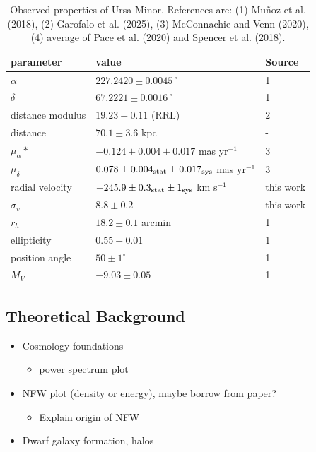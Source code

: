 \begin{table}[t]
\centering
\caption{Observed properties of Ursa Minor. References are: (1) Muñoz et al. (2018), (2) Garofalo et al. (2025), (3) McConnachie and Venn (2020), (4) average of Pace et al. (2020) and Spencer et al. (2018).}
\label{tbl:Observed-properties-of-Ursa-Minor-References-are:-1-Muñoz-et-al-2018-2-Garofalo-et-al-2025-3-McConnachie-and-Venn-2020-4-average-of-Pace-et-al-2020-and-Spencer-et-al-2018}
\begin{tabular}{lll}
\toprule
parameter & value & Source\\
\midrule
$\alpha$ & $ 227.2420 \pm 0.0045$˚ & 1\\
$\delta$ & $67.2221 \pm 0.0016$˚ & 1\\
distance modulus & $19.23 \pm 0.11$ (RRL) & 2\\
distance & $70.1 \pm 3.6$ kpc & -\\
$\mu_\alpha*$ & $-0.124 \pm 0.004 \pm 0.017$ mas yr$^{-1}$ & 3\\
$\mu_\delta$ & $0.078 \pm 0.004_{\rm stat} \pm 0.017_{\rm sys}$ mas yr$^{-1}$ & 3\\
radial velocity & $-245.9 \pm 0.3_{\rm stat} \pm 1_{\rm sys}$ km s$^{-1}$ & this work\\
$\sigma_v$ & $8.8 \pm 0.2$ & this work\\
$r_h$ & $18.2 \pm 0.1$ arcmin & 1\\
ellipticity & $0.55 \pm 0.01$ & 1\\
position angle & $50 \pm 1^\circ$ & 1\\
$M_V$ & $-9.03 \pm 0.05$ & 1\\
\bottomrule
\end{tabular}
\end{table}

\subsection{Theoretical Background}\label{theoretical-background}

\begin{itemize}
\tightlist
\item
  Cosmology foundations

  \begin{itemize}
  \tightlist
  \item
    power spectrum plot
  \end{itemize}
\item
  NFW plot (density or energy), maybe borrow from paper?

  \begin{itemize}
  \tightlist
  \item
    Explain origin of NFW
  \end{itemize}
\item
  Dwarf galaxy formation, halos
\end{itemize}

